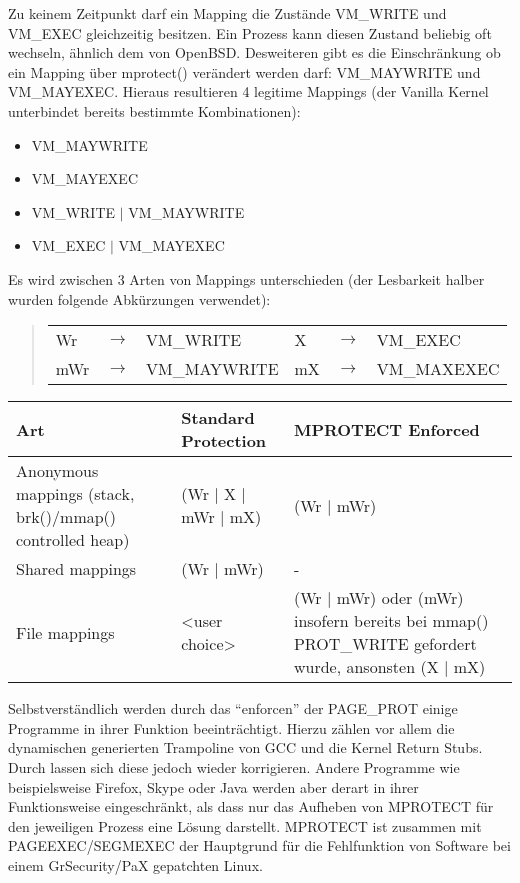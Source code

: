 Zu keinem Zeitpunkt darf ein Mapping die Zustände VM\_WRITE und VM\_EXEC gleichzeitig besitzen. Ein Prozess kann diesen Zustand beliebig oft wechseln, ähnlich dem  von OpenBSD. Desweiteren gibt es die Einschränkung ob ein Mapping über mprotect() verändert werden darf: VM\_MAYWRITE und VM\_MAYEXEC.
Hieraus resultieren 4 legitime Mappings (der Vanilla Kernel unterbindet bereits bestimmte Kombinationen):
\begin{itemize}
\item VM\_MAYWRITE
\item VM\_MAYEXEC
\item VM\_WRITE $\mid$ VM\_MAYWRITE
\item VM\_EXEC $\mid$ VM\_MAYEXEC
\end{itemize}
Es wird zwischen 3 Arten von Mappings unterschieden (der Lesbarkeit halber wurden folgende Abkürzungen verwendet):
\begin{quote}
\begin{tabular}{llllll}
Wr & $\rightarrow$ & VM\_WRITE & X & $\rightarrow$ & VM\_EXEC \\
mWr & $\rightarrow$ & VM\_MAYWRITE & mX & $\rightarrow$ & VM\_MAXEXEC
\end{tabular}
\end{quote}

\begin{tabular}{|p{4.5cm}p{4cm}p{5cm}|}
\hline
Art & Standard Protection & MPROTECT Enforced \\
\hline
Anonymous mappings (stack, brk()/mmap() controlled heap) & (Wr $\mid$ X $\mid$ mWr $\mid$ mX) & (Wr $\mid$ mWr) \\
\hline
Shared mappings & (Wr $\mid$ mWr) & - \\
\hline
File mappings & \textless user choice\textgreater & (Wr $\mid$ mWr) oder (mWr) insofern bereits bei mmap() PROT\_WRITE gefordert wurde, ansonsten (X $\mid$ mX) \\
\hline
\end{tabular}

Selbstverständlich werden durch das "`enforcen"' der PAGE\_PROT einige Programme in ihrer Funktion beeinträchtigt. Hierzu zählen vor allem die dynamischen generierten Trampoline von GCC und die Kernel Return Stubs. Durch  lassen sich diese jedoch wieder korrigieren. Andere Programme wie beispielsweise Firefox, Skype oder Java werden aber derart in ihrer Funktionsweise eingeschränkt, als dass nur das Aufheben von MPROTECT für den jeweiligen Prozess eine Lösung darstellt.
MPROTECT ist zusammen mit PAGEEXEC/SEGMEXEC der Hauptgrund für die Fehlfunktion von Software bei einem GrSecurity/PaX gepatchten Linux.

